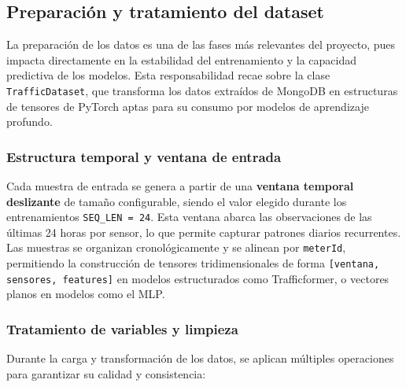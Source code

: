 \subsection{Preparación y tratamiento del dataset}

La preparación de los datos es una de las fases más relevantes del proyecto, pues impacta directamente en la estabilidad del entrenamiento y la capacidad predictiva de los modelos. Esta responsabilidad recae sobre la clase \texttt{TrafficDataset}, que transforma los datos extraídos de MongoDB en estructuras de tensores de PyTorch aptas para su consumo por modelos de aprendizaje profundo.

\subsubsection*{Estructura temporal y ventana de entrada}

Cada muestra de entrada se genera a partir de una \textbf{ventana temporal deslizante} de tamaño configurable, siendo el valor elegido durante los entrenamientos \texttt{SEQ\_LEN = 24}. Esta ventana abarca las observaciones de las últimas 24 horas por sensor, lo que permite capturar patrones diarios recurrentes. Las muestras se organizan cronológicamente y se alinean por \texttt{meterId}, permitiendo la construcción de tensores tridimensionales de forma \texttt{[ventana, sensores, features]} en modelos estructurados como Trafficformer, o vectores planos en modelos como el MLP.

\subsubsection*{Tratamiento de variables y limpieza}

Durante la carga y transformación de los datos, se aplican múltiples operaciones para garantizar su calidad y consistencia:

